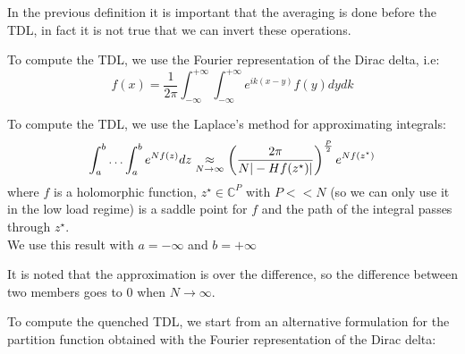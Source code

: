 In the previous definition it is important that the averaging is done before the TDL, in fact it is not true that we can invert these operations.\\
\begin{remark}
    To compute the TDL, we use the Fourier representation of the Dirac delta, i.e:
    \[
    f(x) =\frac{1}{2\pi} \int_{-\infty}^{+\infty} \int_{-\infty}^{+\infty} e^{ik(x-y)} f(y) dy dk
    \]
\end{remark}
\begin{remark}
    To compute the TDL, we use the Laplace's method for approximating integrals:
    \[
    \int_a^b \ldots \int_a^b e^{Nf(z)} dz \underset{N\to\infty}{\approx} \left(\frac{2\pi}{N|-Hf(z^\star)|} \right)^{\frac{P}{2} }e^{Nf(z^\star)}
    \]
    where $f$ is a holomorphic function, $z^\star \in \mathbb{C}^P$ with $P<<N $ (so we can only use it in the low load regime) is a saddle point for $f$ and the path of the integral passes through $z^\star$.  \\
    We use this result with $a= -\infty$ and $b=+\infty$

    \noindent It is noted that the approximation is over the difference, so the difference between two members goes to $0$ when $N\to\infty$.
\end{remark}
To compute the quenched TDL, we start from an alternative formulation for the partition function obtained with the Fourier representation of the Dirac delta:
